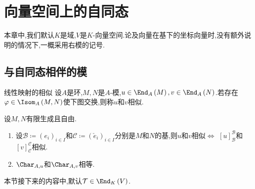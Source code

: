 \chapter{向量空间上的自同态}

本章中,我们默认$K$是域,$V$是$K$-向量空间.论及向量在基下的坐标向量时,没有额外说明的情况下,一概采用右模的记号.

\section{与自同态相伴的模}

\begin{definition}{线性映射的相似}{}
	设$A$是环,$M,N$是$A$-模,$u\in\End_{A}\left(M\right),v\in\End_{A}\left(N\right)$.若存在$\varphi\in\Isom_{A}\left(M,N\right)$使下图交换,则称$u$和$v$相似.
	\begin{center}
	\end{center}
\end{definition}

\begin{remark}{}{}
	设$M,N$有限生成且自由.
	\begin{enumerate}
		\item 设$\mathcal{B}\coloneq\left(e_{i}\right)_{i\in I}$和$\mathcal{C}\coloneq\left(\check{e}_{i}\right)_{i\in I}$分别是$M$和$N$的基,则$u$和$v$相似$\iff$ $\left[u\right]_{\mathcal{B}}^{\mathcal{B}}$和$\left[v\right]_{\mathcal{C}}^{\mathcal{C}}$相似.
		\item $\Char_{A,u}$和$\Char_{A,v}$相等.
	\end{enumerate}
\end{remark}

本节接下来的内容中,默认$\mathcal{T}\in\End_{K}\left(V\right)$.

